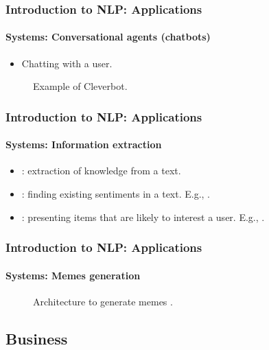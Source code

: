 \documentclass[xcolor=table]{beamer}
\begin{document}
\begin{frame}
\frametitle{Introduction to NLP: Applications}
\framesubtitle{Systems: Conversational agents (chatbots)}

\begin{itemize}
	\item Chatting with a user.
\end{itemize}

\begin{figure}
	\centering
	\caption{Example of Cleverbot.}
\end{figure}

\end{frame}

\begin{frame}
\frametitle{Introduction to NLP: Applications}
\framesubtitle{Systems: Information extraction}

\begin{itemize}
	\item {}: extraction of knowledge from a text.
	\item {}: finding existing sentiments in a text.
	E.g., .
	\item {}: presenting items that are likely to interest a user.
	E.g., .
\end{itemize}

\end{frame}

\begin{frame}
\frametitle{Introduction to NLP: Applications}
\framesubtitle{Systems: Memes generation}

\begin{figure}
	\centering
	\caption{Architecture to generate memes \cite{sadasivam2020memebot}.}
\end{figure}

\end{frame}


\subsection{Business}
\end{document}

